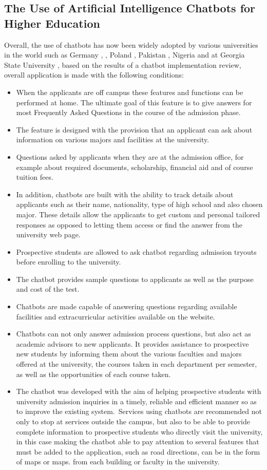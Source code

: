 \documentclass[conference]{IEEEtran}
\begin{document}
\subsection{The Use of Artificial Intelligence Chatbots for Higher Education}
Overall, the use of chatbots has now been widely adopted by various universities in the world such as Germany \cite{b26}, \cite{b19}, Poland \cite{b21}, Pakistan \cite{b28}, Nigeria \cite{b21} and at Georgia State University \cite{b29}, based on the results of a chatbot implementation review, overall application is made with the following conditions:
\begin{itemize}
\item When the applicants are off campus these features and functions can be performed at home. The ultimate goal of this feature is to give answers for most Frequently Asked Questions in the course of the admission phase.
\item The feature is designed with the provision that an applicant can ask about information on various majors and facilities at the university.
\item Questions asked by applicants when they are at the admission office, for example about required documents, scholarship, financial aid and of course tuition fees.
\item In addition, chatbots are built with the ability to track details about applicants such as their name, nationality, type of high school and also chosen major. These details allow the applicants to get custom and personal tailored responses as opposed to letting them access or find the answer from the university web page.
\item Prospective students are allowed to ask chatbot regarding admission tryouts before enrolling to the university. 
\item The chatbot provides sample questions to applicants as well as the purpose and cost of the test.
\item Chatbots are made capable of answering questions regarding available facilities and extracurricular activities available on the website.
\item Chatbots can not only answer admission process questions, but also act as academic advisors to new applicants. It provides assistance to prospective new students by informing them about the various faculties and majors offered at the university, the courses taken in each department per semester, as well as the opportunities of each course taken.
\item The chatbot was developed with the aim of helping prospective students with university admission inquiries in a timely, reliable and efficient manner so as to improve the existing system.\
Services using chatbots are recommended not only to stop at services outside the campus, but also to be able to provide complete information to prospective students who directly visit the university, in this case making the chatbot able to pay attention to several features that must be added to the application, such as road directions, can be in the form of maps or maps. from each building or faculty in the university.
\end{itemize}
\end{document}
